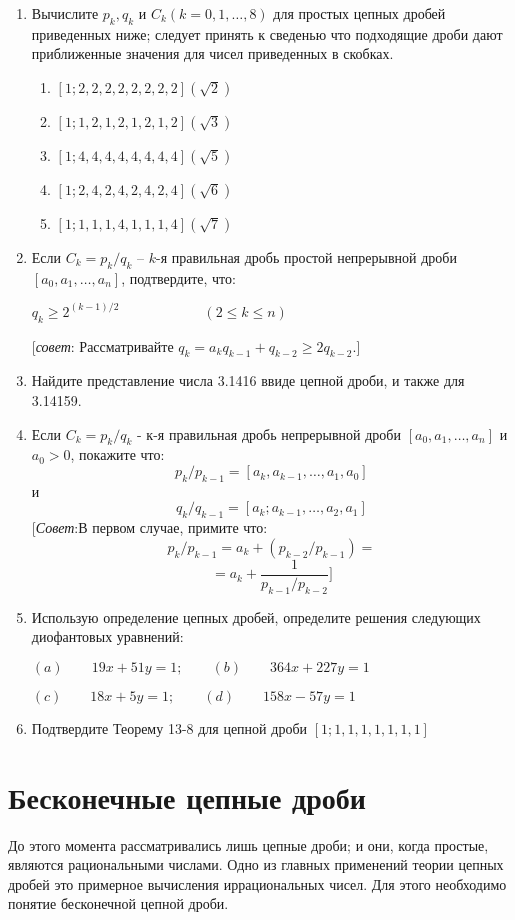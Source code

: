 \documentclass[11pt]{article}
\begin{document}
\begin{enumerate}
	\item Вычислите $p_k,q_k$ и $C_k(k=0,1,\dots,8)$ для простых цепных дробей приведенных ниже; следует принять к сведенью что подходящие дроби дают приближенные значения для чисел приведенных в скобках.
	\begin{enumerate}
	\item$[1;2,2,2,2,2,2,2,2](\sqrt{2})$
	\item$[1;1,2,1,2,1,2,1,2](\sqrt{3})$
	\item$[1;4,4,4,4,4,4,4,4](\sqrt{5})$
	\item$[1;2,4,2,4,2,4,2,4](\sqrt{6})$
	\item$[1;1,1,1,4,1,1,1,4](\sqrt{7})$
		\end{enumerate}	 
	\item Если $C_k=p_k/q_k$ -- $k$-я правильная дробь простой непрерывной дроби $[a_0,a_1,\dots,a_n]$, подтвердите, что: 
		\begin{center}
	$q_k\ge2^{(k-1)/2}\qquad\qquad\qquad(2\le k\le n)$
		\end{center}
	[\textit{совет}: Рассматривайте $q_k=a_kq_{k-1}+q_{k-2}\ge2q_{k-2}$.]
	
	\item Найдите представление числа 3.1416 ввиде цепной дроби, и также для 3.14159.
	
	\item Если $C_k=p_k/q_k$ - к-я правильная дробь непрерывной дроби $[a_0,a_1,\dots,a_n]$ и $a_0>0$, покажите что:
	\[p_k/p_{k-1}=[a_k,a_{k-1},\dots,a_1,a_0]\]
	и
	\[q_k/q_{k-1}=[a_k;a_{k-1},\dots,a_2,a_1]\]
	[\textit{Совет}:В первом случае, примите что:
	\[p_k/p_{k-1}=a_k+(p_{k-2}/p_{k-1})=\]
	\[=a_k+\frac{1}{p_{k-1}/p_{k-2}}]\]
	\item Использую определение цепных дробей, определите решения следующих диофантовых уравнений:
	
	$(a)\qquad19x+51y=1;\qquad(b)\qquad364x+227y=1$
	
		$(c)\qquad18x+5y=1;\qquad(d)\qquad158x-57y=1$
		\\
\item Подтвердите Теорему 13-8 для цепной дроби $[1;1,1,1,1,1,1,1]$ 
\end{enumerate}

		
\section{Бесконечные цепные дроби}

До этого момента рассматривались лишь цепные дроби; и они, когда простые, являются рациональными числами. Одно из главных применений теории цепных дробей это примерное вычисления иррациональных чисел. Для этого необходимо понятие бесконечной цепной дроби.
		
\end{document}
